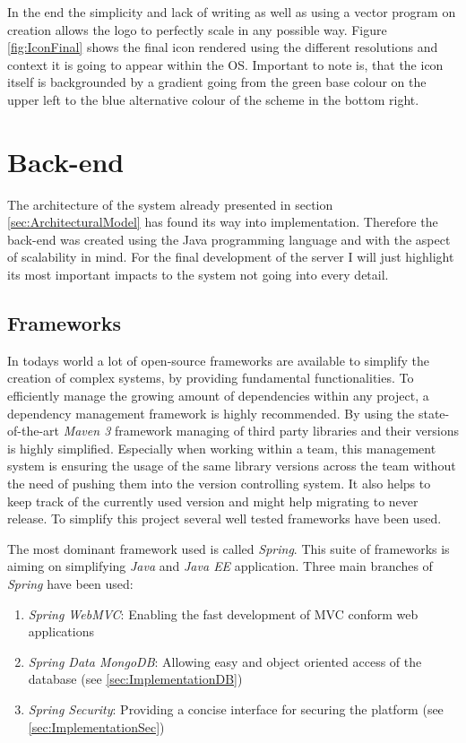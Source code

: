 In the end the simplicity and lack of writing as well as using a vector program on creation allows the logo to perfectly scale in any possible way. Figure \vref{fig:IconFinal} shows the final icon rendered using the different resolutions and context it is going to appear within the \gls{OS}. Important to note is, that the icon itself is backgrounded by a gradient going from the green base colour on the upper left to the blue alternative colour of the scheme in the bottom right.

\section{Back-end}
The architecture of the system already presented in section \vref{sec:ArchitecturalModel} has found its way into implementation. Therefore the back-end was created using the Java programming language and with the aspect of scalability in mind. For the final development of the server I will just highlight its most important impacts to the system not going into every detail.

\subsection{Frameworks}
\label{sec:FrameworksServer}

In todays world a lot of open-source frameworks are available to simplify the creation of complex systems, by providing fundamental functionalities. To efficiently manage the growing amount of dependencies within any project, a dependency management framework is highly recommended. By using the state-of-the-art \emph{Maven 3} framework managing of third party libraries and their versions is highly simplified. Especially when working within a team, this management system is ensuring the usage of the same library versions across the team without the need of pushing them into the version controlling system. It also helps to keep track of the currently used version and might help migrating to never release. To simplify this project several well tested frameworks have been used.

The most dominant framework used is called \emph{Spring}. This suite of frameworks is aiming on simplifying \emph{Java} and \emph{Java EE} application. Three main branches of \emph{Spring} have been used:

\begin{enumerate}
    \item \emph{Spring WebMVC}: Enabling the fast development of \gls{MVC} conform web applications
    \item \emph{Spring Data MongoDB}: Allowing easy and object oriented access of the database (see \vref{sec:ImplementationDB})
    \item \emph{Spring Security}: Providing a concise interface for securing the platform (see \vref{sec:ImplementationSec})
\end{enumerate}

